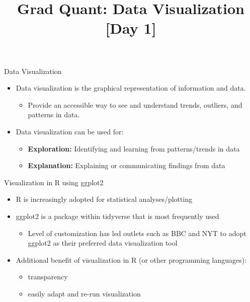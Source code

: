 \documentclass[
  ignorenonframetext,
]{beamer}
\title{Grad Quant: Data Visualization {[}Day 1{]}}
\author{}
\date{}
\providecommand{\tightlist}{%
  \setlength{\itemsep}{0pt}\setlength{\parskip}{0pt}}\usepackage{longtable,booktabs,array}
\begin{document}
\frame{\titlepage}
\ifdefined\Shaded\renewenvironment{Shaded}{\begin{tcolorbox}[enhanced, borderline west={3pt}{0pt}{shadecolor}, boxrule=0pt, sharp corners, frame hidden, interior hidden, breakable]}{\end{tcolorbox}}\fi

\begin{frame}{Data Visualization}
\protect\hypertarget{data-visualization}{}
\begin{itemize}
\tightlist
\item
  Data visualization is the graphical representation of information and
  data.

  \begin{itemize}
  \tightlist
  \item
    Provide an accessible way to see and understand trends, outliers,
    and patterns in data.
  \end{itemize}
\item
  Data visualization can be used for:

  \begin{itemize}
  \tightlist
  \item
    \textbf{Exploration:} Identifying and learning from patterns/trends
    in data
  \item
    \textbf{Explanation:} Explaining or communicating findings from data
  \end{itemize}
\end{itemize}
\end{frame}

\begin{frame}{Visualization in R using ggplot2}
\protect\hypertarget{visualization-in-r-using-ggplot2}{}
\begin{itemize}
\tightlist
\item
  R is increasingly adopted for statistical analyses/plotting
\item
  ggplot2 is a package within tidyverse that is most frequently used

  \begin{itemize}
  \tightlist
  \item
    Level of customization has led outlets such as BBC and NYT to adopt
    ggplot2 as their preferred data visualization tool
  \end{itemize}
\item
  Additional benefit of visualization in R (or other programming
  languages):

  \begin{itemize}
  \tightlist
  \item
    transparency
  \item
    easily adapt and re-run visualization
  \end{itemize}
\end{itemize}
\end{frame}
\end{document}
